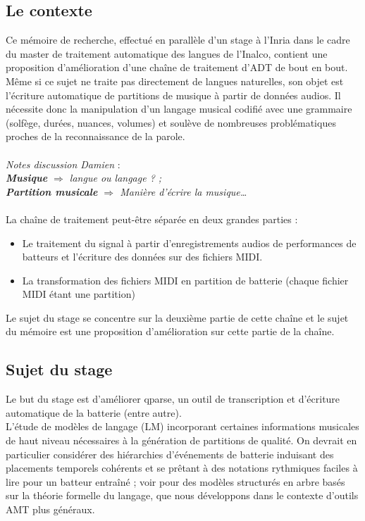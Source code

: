 \subsection*{Le contexte}
Ce mémoire de recherche, effectué en parallèle d’un stage à l’Inria dans le cadre du master de traitement automatique des langues de l’Inalco, contient une proposition d’amélioration d’une chaîne de traitement d’ADT de bout en bout.\\
Même si ce sujet ne traite pas directement de langues naturelles, son objet est l’écriture automatique de partitions de musique à partir de données audios. Il nécessite donc la manipulation d’un langage musical codifié avec une grammaire (solfège, durées, nuances, volumes) et soulève de nombreuses problématiques proches de la reconnaissance de la parole.\\\\
\textit{Notes discussion Damien} :\\
\textit{\textbf{Musique} $\Rightarrow$ langue ou langage ? ;\\
\textbf{Partition musicale} $\Rightarrow$ Manière d’écrire la musique…}\\\\
La chaîne de traitement peut-être séparée en deux grandes parties :
\begin{itemize}
	\item Le traitement du signal à partir d’enregistrements audios de performances de batteurs et l’écriture des données sur des fichiers MIDI.
	\item La transformation des fichiers MIDI en partition de batterie (chaque fichier MIDI étant une partition)\\
\end{itemize}

Le sujet du stage se concentre sur la deuxième partie de cette chaîne et le sujet du mémoire est une proposition d’amélioration sur cette partie de la chaîne.

\subsection*{Sujet du stage}
Le but du stage est d’améliorer qparse, un outil de transcription et d’écriture automatique de la batterie (entre autre).\\
L'étude de modèles de langage (LM) incorporant certaines informations musicales de haut niveau nécessaires à la génération de partitions de qualité. On devrait en particulier considérer des hiérarchies d'événements de batterie induisant des placements temporels cohérents et se prêtant à des notations rythmiques faciles à lire pour un batteur entraîné ; voir \cite{foscarin:hal-01988990} pour des modèles structurés en arbre basés sur la théorie formelle du langage, que nous développons dans le contexte d'outils AMT plus généraux.
